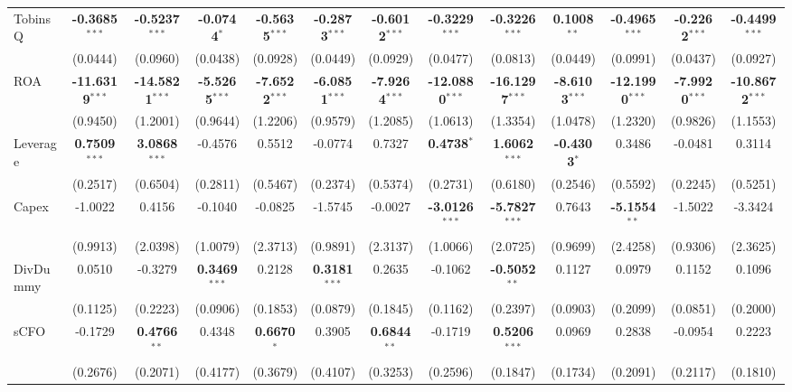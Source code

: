 \documentclass[11pt,a4paper]{article}
\begin{document}
\begin{table}[htbp]
\begin{tabular}{lcccccccccccc}
TobinsQ & \textbf{-0.3685}$^{***}$ & \textbf{-0.5237}$^{***}$ & \textbf{-0.0744}$^{*}$ & \textbf{-0.5635}$^{***}$ & \textbf{-0.2873}$^{***}$ & \textbf{-0.6012}$^{***}$ & \textbf{-0.3229}$^{***}$ & \textbf{-0.3226}$^{***}$ & \textbf{0.1008}$^{**}$ & \textbf{-0.4965}$^{***}$ & \textbf{-0.2262}$^{***}$ & \textbf{-0.4499}$^{***}$ \\
 & (0.0444) & (0.0960) & (0.0438) & (0.0928) & (0.0449) & (0.0929) & (0.0477) & (0.0813) & (0.0449) & (0.0991) & (0.0437) & (0.0927) \\
ROA & \textbf{-11.6319}$^{***}$ & \textbf{-14.5821}$^{***}$ & \textbf{-5.5265}$^{***}$ & \textbf{-7.6522}$^{***}$ & \textbf{-6.0851}$^{***}$ & \textbf{-7.9264}$^{***}$ & \textbf{-12.0880}$^{***}$ & \textbf{-16.1297}$^{***}$ & \textbf{-8.6103}$^{***}$ & \textbf{-12.1990}$^{***}$ & \textbf{-7.9920}$^{***}$ & \textbf{-10.8672}$^{***}$ \\
 & (0.9450) & (1.2001) & (0.9644) & (1.2206) & (0.9579) & (1.2085) & (1.0613) & (1.3354) & (1.0478) & (1.2320) & (0.9826) & (1.1553) \\
Leverage & \textbf{0.7509}$^{***}$ & \textbf{3.0868}$^{***}$ & -0.4576 & 0.5512 & -0.0774 & 0.7327 & \textbf{0.4738}$^{*}$ & \textbf{1.6062}$^{***}$ & \textbf{-0.4303}$^{*}$ & 0.3486 & -0.0481 & 0.3114 \\
 & (0.2517) & (0.6504) & (0.2811) & (0.5467) & (0.2374) & (0.5374) & (0.2731) & (0.6180) & (0.2546) & (0.5592) & (0.2245) & (0.5251) \\
Capex & -1.0022 & 0.4156 & -0.1040 & -0.0825 & -1.5745 & -0.0027 & \textbf{-3.0126}$^{***}$ & \textbf{-5.7827}$^{***}$ & 0.7643 & \textbf{-5.1554}$^{**}$ & -1.5022 & -3.3424 \\
 & (0.9913) & (2.0398) & (1.0079) & (2.3713) & (0.9891) & (2.3137) & (1.0066) & (2.0725) & (0.9699) & (2.4258) & (0.9306) & (2.3625) \\
DivDummy & 0.0510 & -0.3279 & \textbf{0.3469}$^{***}$ & 0.2128 & \textbf{0.3181}$^{***}$ & 0.2635 & -0.1062 & \textbf{-0.5052}$^{**}$ & 0.1127 & 0.0979 & 0.1152 & 0.1096 \\
 & (0.1125) & (0.2223) & (0.0906) & (0.1853) & (0.0879) & (0.1845) & (0.1162) & (0.2397) & (0.0903) & (0.2099) & (0.0851) & (0.2000) \\
sCFO & -0.1729 & \textbf{0.4766}$^{**}$ & 0.4348 & \textbf{0.6670}$^{*}$ & 0.3905 & \textbf{0.6844}$^{**}$ & -0.1719 & \textbf{0.5206}$^{***}$ & 0.0969 & 0.2838 & -0.0954 & 0.2223 \\
 & (0.2676) & (0.2071) & (0.4177) & (0.3679) & (0.4107) & (0.3253) & (0.2596) & (0.1847) & (0.1734) & (0.2091) & (0.2117) & (0.1810) \\

\end{tabular}
\end{table}
\end{document}
